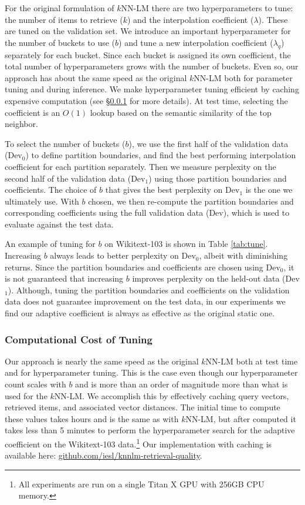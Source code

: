 \documentclass[11pt]{article}
\begin{document}
For the original formulation of $k$NN-LM there are two hyperparameters to tune: the number of items to retrieve ($k$) and the interpolation coefficient ($\lambda$). These are tuned on the validation set. We introduce an important hyperparameter for the number of buckets to use ($b$) and tune a new interpolation coefficient ($\lambda_q$) separately for each bucket. Since each bucket is assigned its own coefficient, the total number of hyperparameters grows with the number of buckets. Even so, our approach has about the same speed as the original $k$NN-LM both for parameter tuning and during inference. We make hyperparameter tuning efficient by caching expensive computation (see \S\ref{sec:tuning} for more details). At test time, selecting the coefficient is an $O(1)$ lookup based on the semantic similarity of the top neighbor.

To select the number of buckets ($b$), we use the first half of the validation data (Dev$_0$) to define partition boundaries, and find the best performing interpolation coefficient for each partition separately. Then we measure perplexity on the second half of the validation data (Dev$_1$) using those partition boundaries and coefficients. The choice of $b$ that gives the best perplexity on Dev$_1$ is the one we ultimately use. With $b$ chosen, we then re-compute the partition boundaries and corresponding coefficients using the full validation data (Dev), which is used to evaluate against the test data.

An example of tuning for $b$ on Wikitext-103 is shown in Table \ref{tab:tune}. Increasing $b$ always leads to better perplexity on Dev$_0$, albeit with diminishing returns. Since the partition boundaries and coefficients are chosen using Dev$_0$, it is not guaranteed that increasing $b$ improves perplexity on the held-out data (Dev$_1$). Although, tuning the partition boundaries and coefficients on the validation data does not guarantee improvement on the test data, in our experiments we find our adaptive coefficient is always as effective as the original static one.


\subsubsection{Computational Cost of Tuning}

\label{sec:tuning}

Our approach is nearly the same speed as the original $k$NN-LM both at test time and for hyperparameter tuning. This is the case even though our hyperparameter count scales with $b$ and is more than an order of magnitude more than what is used for the $k$NN-LM. We accomplish this by effectively caching query vectors, retrieved items, and associated vector distances. The initial time to compute these values takes hours and is the same as with $k$NN-LM, but after computed it takes less than 5 minutes to perform the hyperparameter search for the adaptive coefficient on the Wikitext-103 data.\footnote{All experiments are run on a single Titan X GPU with 256GB CPU memory.} Our implementation with caching is available here: \href{https://github.com/iesl/knnlm-retrieval-quality}{github.com/iesl/knnlm-retrieval-quality}.
\end{document}

